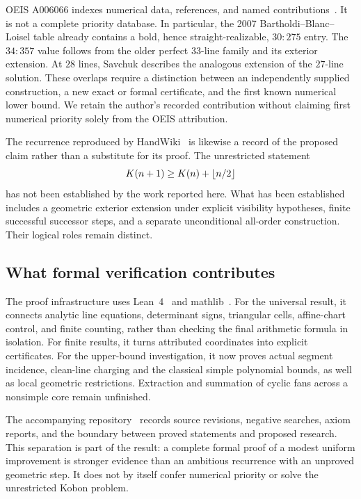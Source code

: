 OEIS A006066 indexes numerical data, references, and named contributions~\citep{oeisA006066}. It is not a complete priority database. In particular, the 2007 Bartholdi--Blanc--Loisel table already contains a bold, hence straight-realizable, $30{:}275$ entry. The $34{:}357$ value follows from the older perfect $33$-line family and its exterior extension. At $28$ lines, Savchuk describes the analogous extension of the $27$-line solution. These overlaps require a distinction between an independently supplied construction, a new exact or formal certificate, and the first known numerical lower bound. We retain the author's recorded contribution without claiming first numerical priority solely from the OEIS attribution.

The recurrence reproduced by HandWiki~\citep{handwiki2026} is likewise a record of the proposed claim rather than a substitute for its proof. The unrestricted statement
\[
 K(n+1)\ge K(n)+\left\lfloor n/2\right\rfloor
\]
has not been established by the work reported here. What has been established includes a geometric exterior extension under explicit visibility hypotheses, finite successful successor steps, and a separate unconditional all-order construction. Their logical roles remain distinct.

\subsection{What formal verification contributes}

The proof infrastructure uses Lean~4~\citep{lean4} and mathlib~\citep{mathlib}. For the universal result, it connects analytic line equations, determinant signs, triangular cells, affine-chart control, and finite counting, rather than checking the final arithmetic formula in isolation. For finite results, it turns attributed coordinates into explicit certificates. For the upper-bound investigation, it now proves actual segment incidence, clean-line charging and the classical simple polynomial bounds, as well as local geometric restrictions. Extraction and summation of cyclic fans across a nonsimple core remain unfinished.

The accompanying repository~\citep{zarzueloRepository} records source revisions, negative searches, axiom reports, and the boundary between proved statements and proposed research. This separation is part of the result: a complete formal proof of a modest uniform improvement is stronger evidence than an ambitious recurrence with an unproved geometric step. It does not by itself confer numerical priority or solve the unrestricted Kobon problem.

